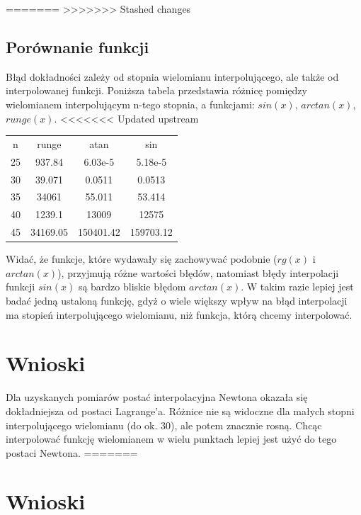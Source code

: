 \documentclass[paper=a4, fontsize=11pt]{scrartcl} %
\numberwithin{equation}{section} %
\numberwithin{figure}{section} %
\numberwithin{table}{section} %
\begin{document}
=======
>>>>>>> Stashed changes
\subsection{Porównanie funkcji}
Błąd dokładności zależy od stopnia wielomianu interpolującego, ale także od interpolowanej funkcji.
Poniższa tabela przedstawia różnicę pomiędzy wielomianem interpolującym n-tego stopnia, a funkcjami:
$sin(x)$, $arctan(x)$, $runge(x)$.
<<<<<<< Updated upstream
\begin{center}
\begin{tabular}{ |c|c|c|c| } 
 \hline
 n & runge & atan & sin \\ 
 25 & 937.84 & 6.03e-5 & 5.18e-5 \\ 
 30 & 39.071 & 0.0511 & 0.0513 \\
 35 & 34061 & 55.011 & 53.414 \\
 40 & 1239.1 & 13009 & 12575 \\
 45 & 34169.05 & 150401.42 & 159703.12 \\ 
 \hline
\end{tabular}
\end{center}
Widać, że funkcje, które wydawały się zachowywać podobnie ($rg(x)$ i $arctan(x)$), przyjmują
różne wartości błędów, natomiast błędy interpolacji funkcji $sin(x)$ są bardzo bliskie błędom
$arctan(x)$. W takim razie lepiej jest badać jedną ustaloną funkcję, gdyż o wiele większy wpływ
na błąd interpolacji ma stopień interpolującego wielomianu, niż funkcja, którą chcemy interpolować.

\section{Wnioski}
Dla uzyskanych pomiarów postać interpolacyjna Newtona okazała się dokładniejsza od postaci Lagrange'a.
Różnice nie są widoczne dla małych stopni interpolującego wielomianu (do ok. 30), ale potem znacznie rosną.
Chcąc interpolować funkcję wielomianem w wielu punktach lepiej jest użyć do tego postaci Newtona.
=======

\section{Wnioski}
\end{document}
